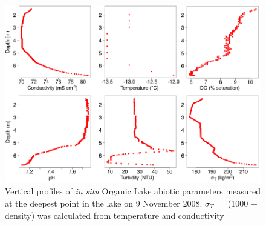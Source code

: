 \begin{figure}
\includegraphics[width=\textwidth]{orglake_figures/probe_profiles.pdf}
\caption[Vertical profiles of \emph{in situ} Organic Lake abiotic parameters]{Vertical profiles of \emph{in situ} Organic Lake abiotic parameters measured at the deepest point in the lake on 9 November 2008. $\sigma_{T} =$ (1000 $-$ density) was calculated from temperature and conductivity}
\label{fig:probe_profiles}

\end{figure}
